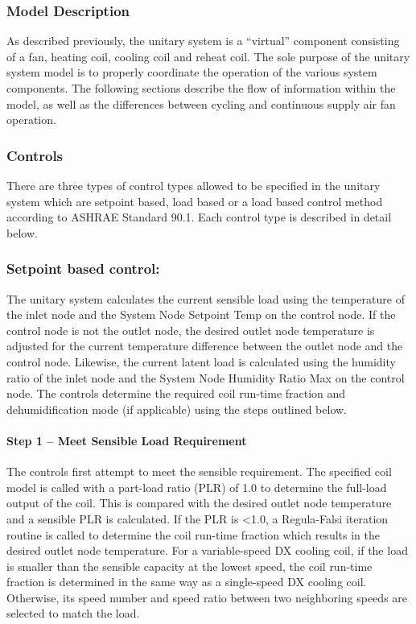 \subsubsection{Model Description}\label{model-description}

As described previously, the unitary system is a ``virtual'' component consisting of a fan, heating coil, cooling coil and reheat coil. The sole purpose of the unitary system model is to properly coordinate the operation of the various system components. The following sections describe the flow of information within the model, as well as the differences between cycling and continuous supply air fan operation.

\subsubsection{Controls}\label{controls}

There are three types of control types allowed to be specified in the unitary system which are setpoint based, load based or a load based control method according to ASHRAE Standard 90.1. Each control type is described in detail below.

\subsubsection{Setpoint based control:}\label{setpoint-based-control}

The unitary system calculates the current sensible load using the temperature of the inlet node and the System Node Setpoint Temp on the control node. If the control node is not the outlet node, the desired outlet node temperature is adjusted for the current temperature difference between the outlet node and the control node. Likewise, the current latent load is calculated using the humidity ratio of the inlet node and the System Node Humidity Ratio Max on the control node. The controls determine the required coil run-time fraction and dehumidification mode (if applicable) using the steps outlined below.

\paragraph{Step 1 -- Meet Sensible Load Requirement}\label{step-1-meet-sensible-load-requirement}

The controls first attempt to meet the sensible requirement. The specified coil model is called with a part-load ratio (PLR) of 1.0 to determine the full-load output of the coil. This is compared with the desired outlet node temperature and a sensible PLR is calculated. If the PLR is \textless{}1.0, a Regula-Falsi iteration routine is called to determine the coil run-time fraction which results in the desired outlet node temperature. For a variable-speed DX cooling coil, if the load is smaller than the sensible capacity at the lowest speed, the coil run-time fraction is determined in the same way as a single-speed DX cooling coil. Otherwise, its speed number and speed ratio between two neighboring speeds are selected to match the load.

